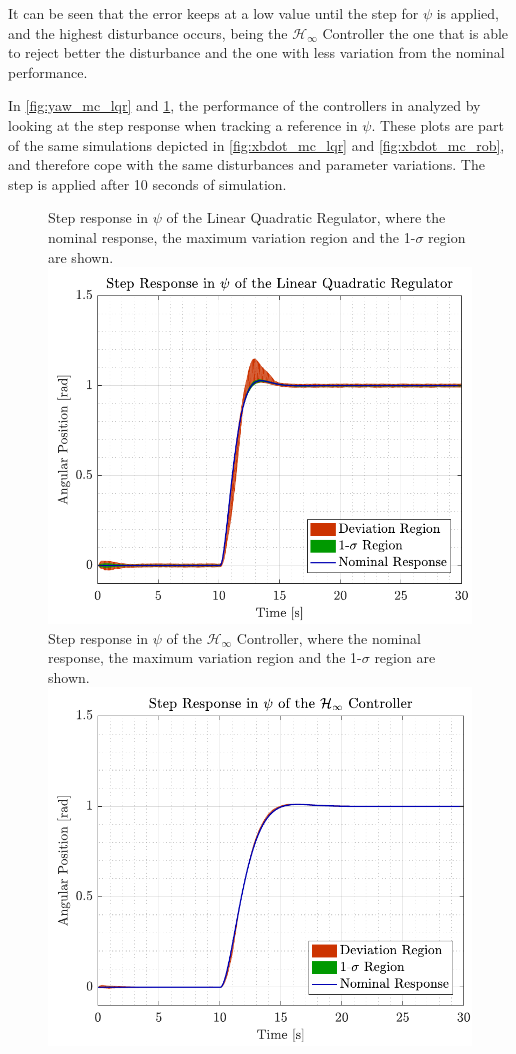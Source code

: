It can be seen that the error keeps at a low value until the step for $\psi$ is applied, and the highest disturbance occurs, being the $\mathcal{H}_\infty$ Controller the one that is able to reject better the disturbance and the one with less variation from the nominal performance.

In \autoref{fig:yaw_mc_lqr} and \ref{fig:yaw_mc_rob}, the performance of the controllers in analyzed by looking at the step response when tracking a reference in $\psi$. These plots are part of the same simulations depicted in \autoref{fig:xbdot_mc_lqr} and \ref{fig:xbdot_mc_rob}, and therefore cope with the same disturbances and parameter variations. The step is applied after 10 seconds of simulation.
\begin{figure}[H]
    \captionbox 
    {   
        Step response in $\psi$ of the Linear Quadratic Regulator, where the nominal response, the maximum variation region and the 1-$\sigma$ region are shown.
        \label{fig:yaw_mc_lqr}
    }                                                                 
    {                                                                  
        \includegraphics[width=.45\textwidth]{figures/yaw_mc_lqr}         
    }                                                                    
    \hspace{5pt}                                                          
    \captionbox  
    {   
        Step response in $\psi$ of the $\mathcal{H}_\infty$ Controller, where the nominal response, the maximum variation region and the 1-$\sigma$ region are shown.   
        \label{fig:yaw_mc_rob}
    }                                                                          
    {
        \includegraphics[width=.45\textwidth]{figures/yaw_mc_rob}
    }
\end{figure}

